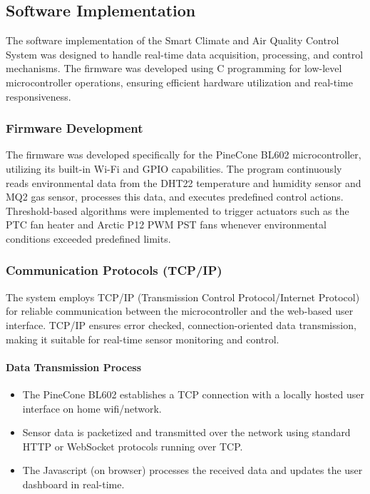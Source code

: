 \documentclass[a4paper]{scrartcl}
\begin{document}
\subsection{Software Implementation}
The software implementation of the Smart Climate and Air Quality Control System was designed to handle real-time data acquisition, processing, and control mechanisms. The firmware was developed using C programming for low-level microcontroller operations, ensuring efficient hardware utilization and real-time responsiveness.

\subsubsection{Firmware Development}
The firmware was developed specifically for the PineCone BL602 microcontroller, utilizing its built-in Wi-Fi and GPIO capabilities. The program continuously reads environmental data from the DHT22 temperature and humidity sensor and MQ2 gas sensor, processes this data, and executes predefined control actions. Threshold-based algorithms were implemented to trigger actuators such as the PTC fan heater and Arctic P12 PWM PST fans whenever environmental conditions exceeded predefined limits.

\subsubsection{Communication Protocols (TCP/IP)}
The system employs TCP\slash IP (Transmission Control Protocol\slash Internet Protocol) for reliable communication between the microcontroller and the web-based user interface. TCP\slash IP  ensures error checked, connection-oriented data transmission, making it suitable for real-time sensor monitoring and control.

\paragraph{Data Transmission Process}
\begin{itemize}
    \item The PineCone BL602 establishes a TCP connection with a locally hosted user interface on home wifi/network.
    \item Sensor data is packetized and transmitted over the network using standard HTTP or WebSocket protocols running over TCP.
    \item The Javascript (on browser) processes the received data and updates the user dashboard in real-time.
\end{itemize}
\end{document}
